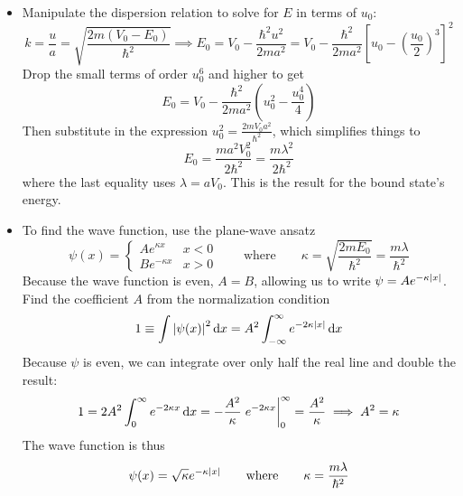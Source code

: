 \documentclass[11pt, a4paper]{article}
\newcommand{\diff}{\mathop{}\!\mathrm{d}} %
\newcommand{\eqtext}[1]{\qquad \text{#1} \qquad}
\begin{document}
\begin{itemize}
	\item Manipulate the dispersion relation to solve for $ E $ in terms of $ u_{0} $:
	\begin{equation*}
		k = \frac{u}{a} = \sqrt{\frac{2m(V_{0}- E_{0})}{\hbar^{2}}} \implies E_{0} = V_{0} - \frac{\hbar^{2}u^{2}}{2ma^{2}} = V_{0} - \frac{\hbar^{2}}{2ma^{2}}\left[u_{0} - \left(\frac{u_{0}}{2}\right)^{3}\right]^{2}
	\end{equation*}
	Drop the small terms of order $ u_{0}^{6} $ and higher to get
	\begin{equation*}
		E_{0} = V_{0} - \frac{\hbar^{2}}{2ma^{2}}\left(u_{0}^{2} - \frac{u_{0}^{4}}{4}\right)
	\end{equation*}
	Then substitute in the expression $ u_{0}^{2} = \frac{2mV_{0}a^{2}}{\hbar^{2}} $, which simplifies things to
	\begin{equation*}
		E_{0} = \frac{ma^{2}V_{0}^{2}}{2\hbar^{2}} = \frac{m\lambda^{2}}{2\hbar^{2}}
	\end{equation*}
	where the last equality uses $ \lambda = a V_{0} $. This is the result for the bound state's energy. 
	
	\item To find the wave function, use the plane-wave ansatz
	\begin{equation*}
		\psi(x) =
		\begin{cases}
			A e^{\kappa x} & x < 0\\
			B e^{-\kappa x} & x > 0
		\end{cases}
		\eqtext{where} \kappa = \sqrt{\frac{2mE_{0}}{\hbar^{2}}} = \frac{m\lambda}{\hbar^{2}}
	\end{equation*}
	Because the wave function is even, $ A = B $, allowing us to write $ \psi = Ae^{-\kappa \abs{x}} $. Find the coefficient $ A $ from the normalization condition
	\begin{equation*}
		1 \equiv \int \abs{\psi(x)}^{2} \diff x = A^{2} \int_{-\infty}^{\infty} e^{-2\kappa \abs{x}} \diff x
	\end{equation*}
	Because $ \psi $ is even, we can integrate over only half the real line and double the result:
	\begin{equation*}
		1 = 2A^{2} \int_{0}^{\infty} e^{-2\kappa x} \diff x = - \frac{A^{2}}{\kappa} \eval{e^{-2\kappa x}}_{0}^{\infty} = \frac{A^{2}}{\kappa} \implies A^{2} = \kappa
	\end{equation*}
	The wave function is thus
	\begin{equation*}
		\psi(x) = \sqrt{\kappa} e^{-\kappa \abs{x}} \eqtext{where} \kappa = \frac{m\lambda}{\hbar^{2}}
	\end{equation*}
	
\end{itemize}
\end{document}
